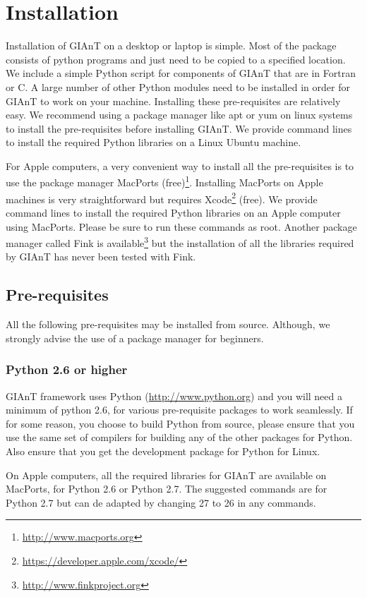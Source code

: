 \chapter{Installation}
\label{chap:python}

Installation of GIAnT on a desktop or laptop is simple. Most of the package consists of python programs and just need to be copied to a specified location. We include a simple Python script for components of GIAnT that are in Fortran or C. A large number of other Python modules need to be installed in order for GIAnT to work on your machine. Installing these pre-requisites are relatively easy. We recommend using a package manager like apt or yum on linux systems to install the pre-requisites before installing GIAnT. We provide command lines to install the required Python libraries on a Linux Ubuntu machine.

For Apple computers, a very convenient way to install all the pre-requisites is to use the package manager MacPorts (free)\footnote{\url{http://www.macports.org}}. Installing MacPorts on Apple machines is very straightforward but requires Xcode\footnote{\url{https://developer.apple.com/xcode/}} (free). We provide command lines to install the required Python libraries on an Apple computer using MacPorts. Please be sure to run these commands as root. Another package manager called Fink is available\footnote{\url{http://www.finkproject.org}} but the installation of all the libraries required by GIAnT has never been tested with Fink.

\section{Pre-requisites}
\label{sec:prereq}
All the following pre-requisites may be installed from source. Although, we strongly advise the use of a package manager for beginners.

\subsection{Python 2.6 or higher}
GIAnT framework uses Python (\url{http://www.python.org}) and you will need a minimum of python 2.6, for various pre-requisite packages to work seamlessly. If for some reason, you choose to build Python from source, please ensure that you use the same set of compilers for building any of the other packages for Python. Also ensure that you get the development package for Python for Linux. 

On Apple computers, all the required libraries for GIAnT are available on MacPorts, for Python 2.6 or Python 2.7. The suggested commands are for Python 2.7 but can de adapted by changing 27 to 26 in any commands.

